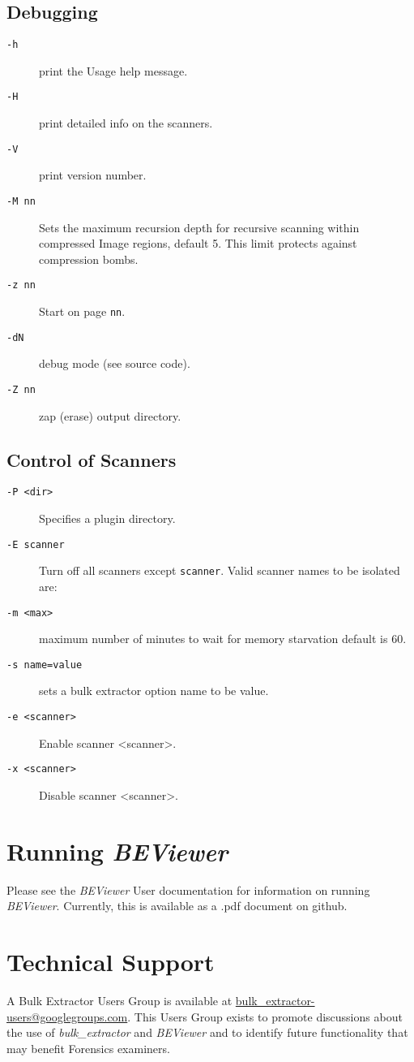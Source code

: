 \documentclass[10pt,twoside]{article}
\newcommand{\bulk}{\emph{bulk\_extractor}\xspace}
\newcommand{\bev}{\emph{BEViewer}\xspace}
\begin{document}
\subsection*{Debugging}
\begin{description}
\item[\texttt{-h}] print the Usage help message.
\item[\texttt{-H}] print detailed info on the scanners.
\item[\texttt{-V}] print version number.
\item[\texttt{-M nn}] Sets the maximum recursion depth for recursive scanning
within compressed Image regions, default 5.
This limit protects against compression bombs.
\item[\texttt{-z nn}] Start on page \texttt{nn}.
\item[\texttt{-dN}] debug mode (see source code).
\item[\texttt{-Z nn}] zap (erase) output directory.
\end{description}

\subsection*{Control of Scanners}
\begin{description}
\item[\texttt{-P <dir>}] Specifies a plugin directory.
\item[\texttt{-E scanner}] Turn off all scanners except \texttt{scanner}.
Valid scanner names to be isolated are:
\item[\texttt{-m <max>}] maximum number of minutes to wait for memory starvation
                  default is 60.
\item[\texttt{-s name=value}] sets a bulk extractor option name to be value.
\item[\texttt{-e <scanner>}] Enable scanner <scanner>.
\item[\texttt{-x <scanner>}] Disable scanner <scanner>.
\end{description}


\section{Running \bev}
Please see the \bev User documentation for information on running \bev.
Currently, this is available as a .pdf document on github.

\section{Technical Support}
A Bulk Extractor Users Group is available at \url{bulk\_extractor-users@googlegroups.com}.
This Users Group exists to promote discussions about the use of \bulk and \bev
and to identify future functionality that may benefit Forensics examiners.
\end{document}
